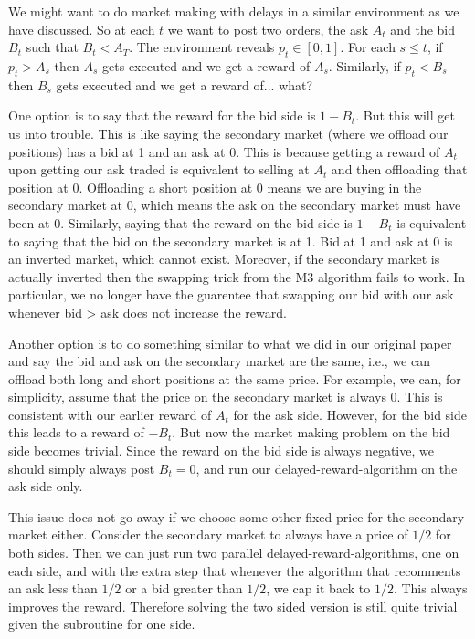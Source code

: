 \documentclass[11pt]{article}
\title{}
\author{}
\date{}
\begin{document}
We might want to do market making with delays in a similar environment as we have discussed. So at each $t$ we want to post two orders, the ask $A_t$ and the bid $B_t$ such that $B_t < A_T$. The environment reveals $p_t\in [0,1]$. For each $s \leq t$, if $p_t > A_s$ then $A_s$ gets executed and we get a reward of $A_s$. Similarly, if $p_t < B_s$ then $B_s$ gets executed and we get a reward of... what?

One option is to say that the reward for the bid side is $1-B_t$. But this will get us into trouble. This is like saying the secondary market (where we offload our positions) has a bid at 1 and an ask at 0. This is because getting a reward of $A_t$ upon getting our ask traded is equivalent to selling at $A_t$ and then offloading that position at 0. Offloading a short position at 0 means we are buying in the secondary market at 0, which means the ask on the secondary market must have been at 0. Similarly, saying that the reward on the bid side is $1-B_t$ is equivalent to saying that the bid on the secondary market is at 1. Bid at 1 and ask at 0 is an inverted market, which cannot exist. Moreover, if the secondary market is actually inverted then the swapping trick from the M3 algorithm fails to work. In particular, we no longer have the guarentee that swapping our bid with our ask whenever bid > ask does not increase the reward.

Another option is to do something similar to what we did in our original paper and say the bid and ask on the secondary market are the same, i.e., we can offload both long and short positions at the same price. For example, we can, for simplicity, assume that the price on the secondary market is always 0. This is consistent with our earlier reward of $A_t$ for the ask side. However, for the bid side this leads to a reward of $-B_t$. But now the market making problem on the bid side becomes trivial. Since the reward on the bid side is always negative, we should simply always post $B_t = 0$, and run our delayed-reward-algorithm on the ask side only.

This issue does not go away if we choose some other fixed price for the secondary market either. Consider the secondary market to always have a price of $1/2$ for both sides. Then we can just run two parallel delayed-reward-algorithms, one on each side, and with the extra step that whenever the algorithm that recomments an ask less than $1/2$ or a bid greater than $1/2$, we cap it back to $1/2$. This always improves the reward. Therefore solving the two sided version is still quite trivial given the subroutine for one side.
\end{document}
